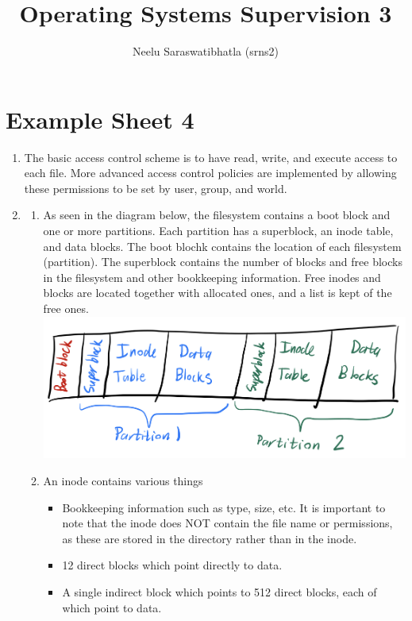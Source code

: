 \documentclass[12pt]{article}
\author{Neelu Saraswatibhatla (srns2)}
\title{Operating Systems Supervision 3}
\date{\vspace{-5ex}}
\begin{document}
\maketitle

\section{Example Sheet 4}

\begin{enumerate}
    \item The basic access control scheme is to have read, write, and execute access to each file. More advanced access control policies are implemented by allowing these permissions to be set by user, group, and world.
    \item \begin{enumerate}
        \item As seen in the diagram below, the filesystem contains a boot block and one or more partitions. Each partition has a superblock, an inode table, and data blocks. The boot blochk contains the location of each filesystem (partition). The superblock contains the number of blocks and free blocks in the filesystem and other bookkeeping information. Free inodes and blocks are located together with allocated ones, and a list is kept of the free ones.\\
        \includegraphics[scale=0.25]{2a.jpg}
        \item An inode contains various things \begin{itemize}
            \item Bookkeeping information such as type, size, etc. It is important to note that the inode does NOT contain the file name or permissions, as these are stored in the directory rather than in the inode.
            \item 12 direct blocks which point directly to data.
            \item A single indirect block which points to 512 direct blocks, each of which point to data.

\end{itemize}
\end{enumerate}
\end{enumerate}
\end{document}
